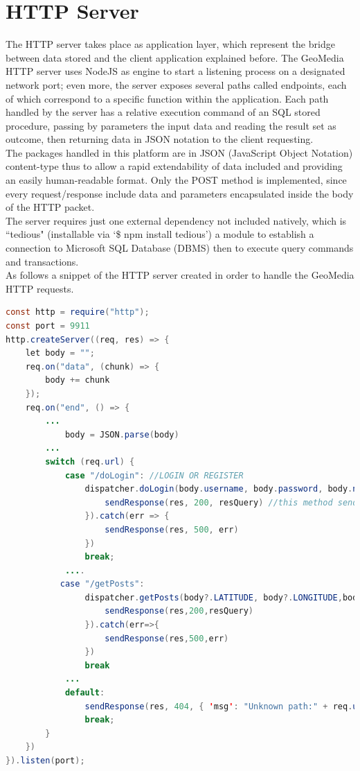 \documentclass[conference]{IEEEtran}
\begin{document}
\section{HTTP Server}

The HTTP server takes place as application layer, which represent the bridge between data stored and the client application explained before.
The GeoMedia HTTP server uses NodeJS\cite{b4} as engine to start a listening process on a designated network port; even more, the server exposes several paths called endpoints, each of which correspond to a specific function within the application. 
Each path handled by the server has a relative execution command of an SQL stored procedure, passing by parameters the input data and reading the result set as outcome, then returning data in JSON notation to the client requesting.
\\
The packages handled in this platform are in JSON (JavaScript Object Notation) content-type thus to allow a rapid extendability of data included and providing an easily human-readable format.
Only the POST method is implemented, since every request/response include data and parameters encapsulated inside the body of the HTTP packet.
\\
The server requires just one external dependency not included natively, which is ``tedious"\cite{b5} (installable via `\$ npm install tedious') a module to establish a connection to Microsoft SQL Database (DBMS) then to execute query commands and transactions.
\\
As follows a snippet of the HTTP server created in order to handle the GeoMedia HTTP requests.
\begin{lstlisting}[language=Java, caption=Snippet of GeoMedia HTTP server]
const http = require("http");
const port = 9911
http.createServer((req, res) => {
    let body = "";
    req.on("data", (chunk) => {
        body += chunk
    });
    req.on("end", () => {
        ...
            body = JSON.parse(body)
        ...
        switch (req.url) {
            case "/doLogin": //LOGIN OR REGISTER
                dispatcher.doLogin(body.username, body.password, body.newuser).then(resQuery => {
                    sendResponse(res, 200, resQuery) //this method sends back the data
                }).catch(err => {
                    sendResponse(res, 500, err)
                })
                break;
            ....
           case "/getPosts":
                dispatcher.getPosts(body?.LATITUDE, body?.LONGITUDE,body?.USERNAME).then(resQuery=>{
                    sendResponse(res,200,resQuery)
                }).catch(err=>{
                    sendResponse(res,500,err)
                })
                break
            ...
            default:
                sendResponse(res, 404, { 'msg': "Unknown path:" + req.url })
                break;
        }
    })
}).listen(port);
\end{lstlisting}
\end{document}
